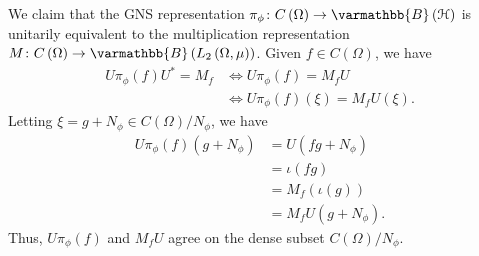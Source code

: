 \documentclass[10pt]{mypackage}
\renewcommand*{\mathbb}[1]{\varmathbb{#1}}
\newcommand{\B}{\mathbb{B}}
\begin{document}
\begin{example}
  We claim that the GNS representation $\pi_{\phi}\colon C\left(\Omega\right)\rightarrow \B\left(\mathcal{H}\right)$ is unitarily equivalent to the multiplication representation $M\colon C\left(\Omega\right)\rightarrow \B\left(L_2\left(\Omega,\mu\right)\right)$. Given $f\in C\left(\Omega\right)$, we have
  \begin{align*}
    U\pi_{\phi}\left(f\right)U^{\ast} = M_f &\Leftrightarrow U\pi_{\phi}\left(f\right) = M_fU\\
                                            &\Leftrightarrow U\pi_{\phi}\left(f\right)\left(\xi\right) = M_fU\left(\xi\right).
  \end{align*}
  Letting $\xi = g + N_{\phi}\in C\left(\Omega\right)/N_{\phi}$, we have
  \begin{align*}
    U\pi_{\phi}\left(f\right)\left(g + N_{\phi}\right) &= U\left(fg + N_{\phi}\right)\\
                                                       &= \iota\left(fg\right)\\
                                                       &= M_f\left(\iota\left(g\right)\right)\\
                                                       &= M_fU\left(g + N_{\phi}\right).
  \end{align*}
  Thus, $U\pi_{\phi}(f)$ and $M_fU$ agree on the dense subset $C\left(\Omega\right)/N_{\phi}$.
\end{example}
\end{document}
